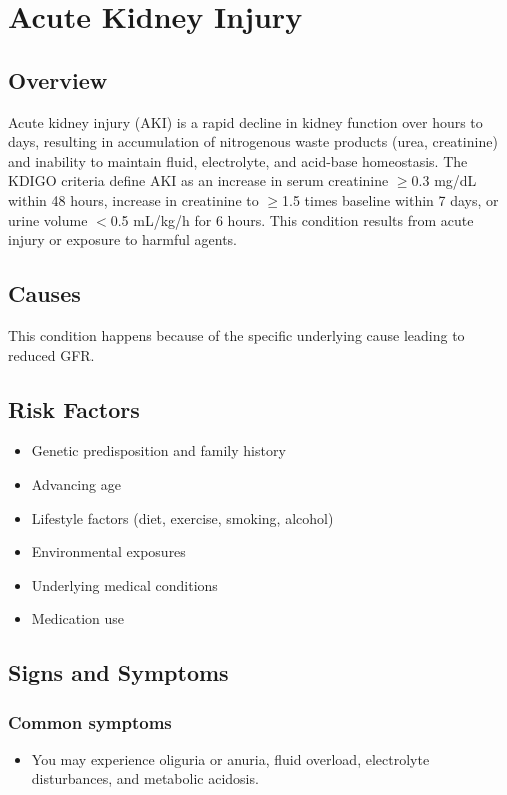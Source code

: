 \chapter{Acute Kidney Injury}
\label{sec:Acute Kidney Injury}

\section{Overview}
Acute kidney injury (AKI) is a rapid decline in kidney function over hours to days, resulting in accumulation of nitrogenous waste products (urea, creatinine) and inability to maintain fluid, electrolyte, and acid-base homeostasis. The KDIGO criteria define AKI as an increase in serum creatinine $\geq$0.3 mg/dL within 48 hours, increase in creatinine to $\geq$1.5 times baseline within 7 days, or urine volume $<$0.5 mL/kg/h for 6 hours. This condition results from acute injury or exposure to harmful agents.
\section{Causes}
This condition happens because of the specific underlying cause leading to reduced GFR.     
\section{Risk Factors}

\begin{itemize}[noitemsep]
  \item Genetic predisposition and family history
  \item Advancing age
  \item Lifestyle factors (diet, exercise, smoking, alcohol)
  \item Environmental exposures
  \item Underlying medical conditions
  \item Medication use
\end{itemize}
\section{Signs and Symptoms}

\subsection{Common symptoms}
\begin{itemize}[noitemsep]
  \item You may experience oliguria or anuria, fluid overload, electrolyte disturbances, and metabolic acidosis. 
  \end{itemize}

